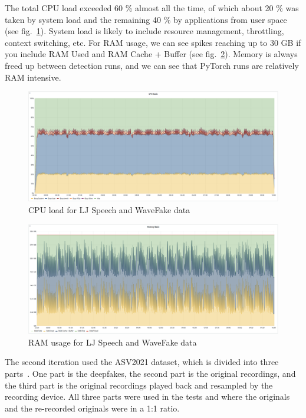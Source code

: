 The total CPU load exceeded 60 \% almost all the time, of which about 20 \% was taken by system load and the remaining 40 \% by applications from user space (see fig.~\ref{fig:lj_wf_cpu}). System load is likely to include resource management, throttling, context switching, etc. For RAM usage, we can see spikes reaching up to 30 GB if you include RAM Used and RAM Cache + Buffer (see fig.~\ref{fig:lj_wf_ram}). Memory is always freed up between detection runs, and we can see that PyTorch runs are relatively RAM intensive.

\begin{figure}[H]
    \centering
    \includegraphics[width=1\linewidth]{other-fig/tests/lj_wf_cpu.png}
    \caption{CPU load for LJ Speech and WaveFake data}
    \label{fig:lj_wf_cpu}
\end{figure}

\begin{figure}[H]
    \centering
    \includegraphics[width=1\linewidth]{other-fig/tests/lj_wf_ram.png}
    \caption{RAM usage for LJ Speech and WaveFake data}
    \label{fig:lj_wf_ram}
\end{figure}

The second iteration used the ASV2021 dataset, which is divided into three parts~\cite{ASV2021}. One part is the deepfakes, the second part is the original recordings, and the third part is the original recordings played back and resampled by the recording device. All three parts were used in the tests and where the originals and the re-recorded originals were in a 1:1 ratio.

